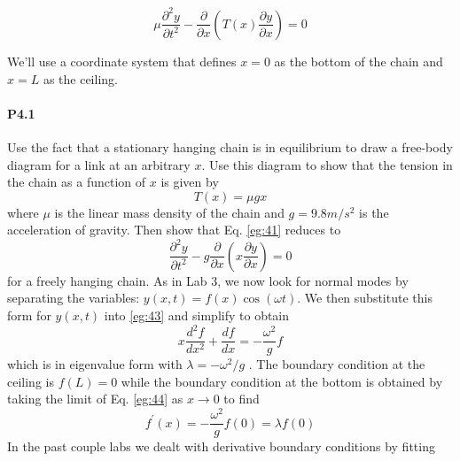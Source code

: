 \documentclass{book}
\theoremstyle{plain}
\theoremstyle{definition}
\numberwithin{exm}{chapter}
\theoremstyle{remark}
\theoremstyle{summary}
\theoremstyle{overview}
\begin{document}
\begin{equation}\label{eq:41}
		\mu \frac{\partial^2 y}{\partial t^2} - \frac{\partial}{\partial x}(T(x)\frac{\partial y}{\partial x}) = 0
				\end{equation}
				
		We\rq ll use a coordinate system that defines $x = 0$ as the bottom of the chain and
$x = L$ as the ceiling.		

\paragraph*{P4.1}
Use the fact that a stationary hanging chain is in equilibrium to draw a
free-body diagram for a link at an arbitrary $x$. Use this diagram to show that
the tension in the chain as a function of $x$ is given by
	\begin{equation}\label{eq:42}
		T(x) = \mu g x
				\end{equation}		
				where $\mu$ is the linear mass density of the chain and $g = 9.8 m/s^2$
is the acceleration of gravity. Then show that Eq. \eqref{eg:41} reduces to	
	\begin{equation}\label{eq:43}
		 \frac{\partial^2 y}{\partial t^2} - g\frac{\partial}{\partial x}(x\frac{\partial y}{\partial x}) = 0
				\end{equation}	
				for a freely hanging chain.
			As in Lab 3, we now look for normal modes by separating the variables:
$y(x,t) = f(x)\cos(\omega t)$. We then substitute this form for $y(x,t)$ into \eqref{eg:43} and simplify to obtain	
		\begin{equation}\label{eq:44}
		 x \frac{d^2 f}{dx^2}+\frac{df}{dx} = - \frac{\omega^2}{g}f
				\end{equation}		
				which is in eigenvalue form with $ \lambda = −\omega^2/g$ . The boundary condition at the
ceiling is $f (L) = 0$ while the boundary condition at the bottom is obtained by
taking the limit of Eq. \eqref{eg:44} as $x \rightarrow 0$ to find
	\begin{equation}\label{eq:45}
		f^\prime(x) = - \frac{\omega^2}{g}f(0) = \lambda f(0)
				\end{equation}		
				In the past couple labs we dealt with derivative boundary conditions by fitting
\end{document}
